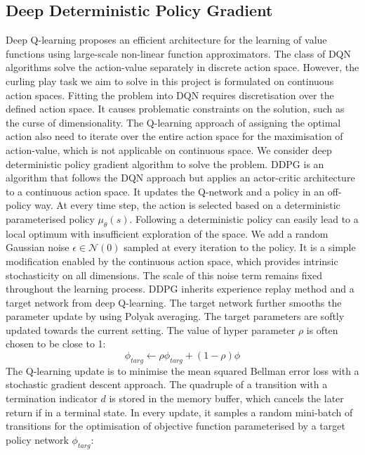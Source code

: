 \documentclass[oneside,11pt,a4paper]{article}
\begin{document}
\subsection{Deep Deterministic Policy Gradient}
Deep Q-learning proposes an efficient architecture for the learning of value functions using large-scale non-linear function approximators. The class of DQN algorithms solve the action-value separately in discrete action space. However, the curling play task we aim to solve in this project is formulated on continuous action spaces. Fitting the problem into DQN requires discretisation over the defined action space. It causes problematic constraints on the solution, such as the curse of dimensionality. The Q-learning approach of assigning the optimal action also need to iterate over the entire action space for the maximisation of action-value, which is not applicable on continuous space.
\newline
\newline
\noindent
We consider deep deterministic policy gradient algorithm to solve the problem. \cite{ddpg}DDPG is an algorithm that follows the DQN approach but applies an actor-critic architecture to a continuous action space. It updates the Q-network and a policy in an off-policy way. At every time step, the action is selected based on a deterministic parameterised policy $\mu_\theta(s)$. Following a deterministic policy can easily lead to a local optimum with insufficient exploration of the space. We add a random Gaussian noise $\epsilon \in \mathcal N(0)$ sampled at every iteration to the policy. It is a simple modification enabled by the continuous action space, which provides intrinsic stochasticity on all dimensions. The scale of this noise term remains fixed throughout the learning process.
\newline
\newline
\noindent
DDPG inherits experience replay method and a target network from deep Q-learning. The target network further smooths the parameter update by using Polyak averaging. The target parameters are softly updated towards the current setting. The value of hyper parameter $\rho$ is often chosen to be close to 1:
$$
\phi_{targ} \leftarrow \rho\phi_{targ} + (1-\rho)\phi
$$
The Q-learning update is to minimise the mean squared Bellman error loss with a stochastic gradient descent approach. The quadruple of a transition with a termination indicator $d$ is stored in the memory buffer, which cancels the later return if in a terminal state. In every update, it samples a random mini-batch of transitions for the optimisation of objective function parameterised by a target policy network $\phi_{targ}$:
\end{document}
